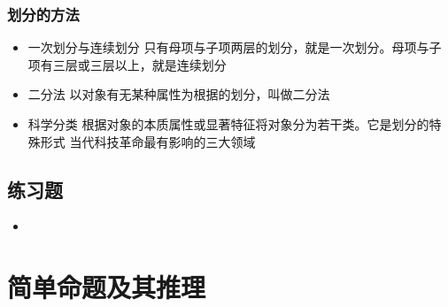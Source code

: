 \documentclass[11pt]{article}
\begin{document}
\subsubsection{划分的方法}
\label{sec-3-3-2}
\begin{itemize}
\item 一次划分与连续划分
只有母项与子项两层的划分，就是一次划分。母项与子项有三层或三层以上，就是连续划分
\item 二分法
以对象有无某种属性为根据的划分，叫做二分法
\item 科学分类
根据对象的本质属性或显著特征将对象分为若干类。它是划分的特殊形式
当代科技革命最有影响的三大领域
\end{itemize}
\subsection{练习题}
\label{sec-3-4}
\begin{itemize}
\item
\end{itemize}
\section{简单命题及其推理}
\label{sec-4}
\end{document}
